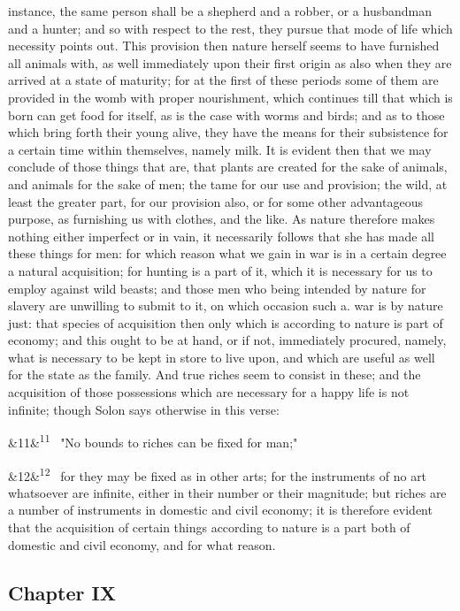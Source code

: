 \documentclass[12pt]{article}
\newcommand{\para}[1][]{\par\noindent\ifx&#1&\else\textsuperscript{\footnotesize #1}~\fi}
\begin{document}
instance, the same person shall be a shepherd and a robber, or a husbandman and a hunter; and so with respect to the rest, they pursue that mode of life which necessity points out. This provision then nature herself seems to have furnished all animals with, as well immediately upon their first origin as also when they are arrived at a state of maturity; for at the first of these periods some of them are provided in the womb with proper nourishment, which continues till that which is born can get food for itself, as is the case with worms and birds; and as to those which bring forth their young alive, they have the means for their subsistence for a certain time within themselves, namely milk. It is evident then that we may conclude of those things that are, that plants are created for the sake of animals, and animals for the sake of men; the tame for our use and provision; the wild, at least the greater part, for our provision also, or for some other advantageous purpose, as furnishing us with clothes, and the like. As nature therefore makes nothing either imperfect or in vain, it necessarily follows that she has made all these things for men: for which reason what we gain in war is in a certain degree a natural acquisition; for hunting is a part of it, which it is necessary for us to employ against wild beasts; and those men who being intended by nature for slavery are unwilling to submit to it, on which occasion such a. war is by nature just: that species of acquisition then only which is according to nature is part of economy; and this ought to be at hand, or if not, immediately procured, namely, what is necessary to be kept in store to live upon, and which are useful as well for the state as the family. And true riches seem to consist in these; and the acquisition of those possessions which are necessary for a happy life is not infinite; though Solon says otherwise in this verse:

\para[11] "No bounds to riches can be fixed for man;"

\para[12] for they may be fixed as in other arts; for the instruments of no art whatsoever are infinite, either in their number or their magnitude; but riches are a number of instruments in domestic and civil economy; it is therefore evident that the acquisition of certain things according to nature is a part both of domestic and civil economy, and for what reason.

\subsection*{Chapter IX}
\end{document}
